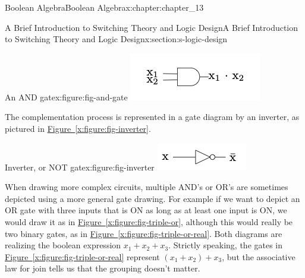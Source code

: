 \documentclass[oneside,10pt,]{book}
\newcommand{\xreffont}{\relax}
\numberwithin{equation}{section}
\begin{document}
\begin{chapterptx}{Boolean Algebra}{}{Boolean Algebra}{}{}{x:chapter:chapter_13}
\begin{sectionptx}{A Brief Introduction to Switching Theory and Logic Design}{}{A Brief Introduction to Switching Theory and Logic Design}{}{}{x:section:s-logic-design}
\begin{sidebyside}{2}{0}{0}{0}
\begin{sbspanel}{0.5}
\begin{figureptx}{An AND gate}{x:figure:fig-and-gate}{}
\includegraphics[width=\linewidth]{images/fig-and-gate.png}
\tcblower
\end{figureptx}%
\end{sbspanel}%
\end{sidebyside}%
\begin{sidebyside}{2}{0}{0}{0}%
\begin{sbspanel}{0.5}%
The complementation process is represented in a gate diagram by an inverter, as pictured in \hyperref[x:figure:fig-inverter]{Figure~{\xreffont\ref{x:figure:fig-inverter}}}.%
\end{sbspanel}%
\begin{sbspanel}{0.5}%
\begin{figureptx}{Inverter, or NOT gate}{x:figure:fig-inverter}{}%
\includegraphics[width=\linewidth]{images/fig-inverter.png}
\tcblower
\end{figureptx}%
\end{sbspanel}%
\end{sidebyside}%
\par
When drawing more complex circuits, multiple AND's or OR's are sometimes depicted using a more general gate drawing. For example if we want to depict an OR gate with three inputs that is ON as long as at least one input is ON, we would draw it as in  \hyperref[x:figure:fig-triple-or]{Figure~{\xreffont\ref{x:figure:fig-triple-or}}}, although this would really be two binary gates, as in  \hyperref[x:figure:fig-triple-or-real]{Figure~{\xreffont\ref{x:figure:fig-triple-or-real}}}. Both diagrams are realizing the boolean expression  \(x_1 + x_2 + x_3\). Strictly speaking, the gates in \hyperref[x:figure:fig-triple-or-real]{Figure~{\xreffont\ref{x:figure:fig-triple-or-real}}} represent \((x_1 + x_2 )+ x_3\), but the associative law for join tells us that the grouping doesn't matter.%

\end{sectionptx}
\end{chapterptx}
\end{document}
